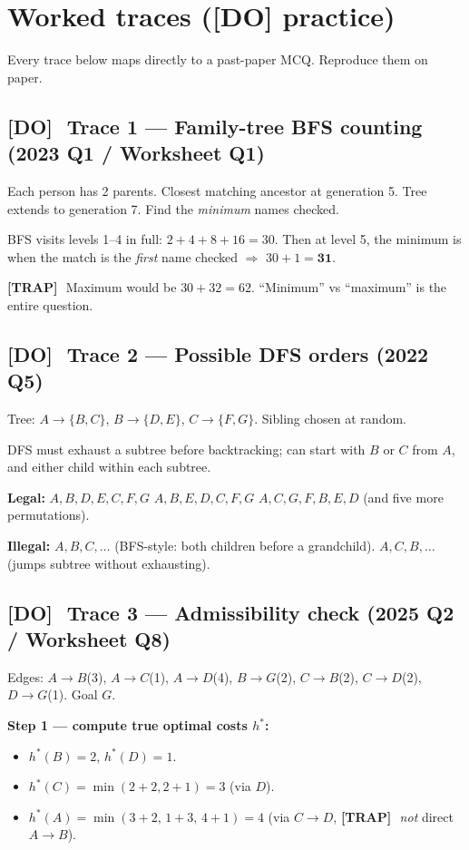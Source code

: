 \documentclass[11pt, a4paper]{article}
\newcommand{\trapflag}{\textcolor{trapBd}{\textbf{[TRAP]}}\,}
\newcommand{\doflag}{\textcolor{doBd}{\textbf{[DO]}}\,}
\begin{document}
\section{Worked traces ([DO] practice)}

Every trace below maps directly to a past-paper MCQ. Reproduce them on paper.

\subsection{\doflag\ Trace 1 --- Family-tree BFS counting (2023 Q1 / Worksheet Q1)}

Each person has 2 parents. Closest matching ancestor at generation 5. Tree extends to generation 7. Find the \emph{minimum} names checked.

BFS visits levels 1--4 in full: $2 + 4 + 8 + 16 = 30$. Then at level 5, the minimum is when the match is the \emph{first} name checked $\Rightarrow$ $30 + 1 = \mathbf{31}$.

\trapflag\ Maximum would be $30 + 32 = 62$. ``Minimum'' vs ``maximum'' is the entire question.

\subsection{\doflag\ Trace 2 --- Possible DFS orders (2022 Q5)}

Tree: $A \to \{B, C\}$, $B \to \{D, E\}$, $C \to \{F, G\}$. Sibling chosen at random.

DFS must exhaust a subtree before backtracking; can start with $B$ or $C$ from $A$, and either child within each subtree.

\textbf{Legal:} $A,B,D,E,C,F,G$ \quad $A,B,E,D,C,F,G$ \quad $A,C,G,F,B,E,D$ \quad (and five more permutations).

\textbf{Illegal:} $A,B,C,\dots$ (BFS-style: both children before a grandchild). $A,C,B,\dots$ (jumps subtree without exhausting).

\subsection{\doflag\ Trace 3 --- Admissibility check (2025 Q2 / Worksheet Q8)}

Edges: $A{\to}B$(3), $A{\to}C$(1), $A{\to}D$(4), $B{\to}G$(2), $C{\to}B$(2), $C{\to}D$(2), $D{\to}G$(1). Goal $G$.

\textbf{Step 1 --- compute true optimal costs $h^*$:}
\begin{itemize}
  \item $h^*(B) = 2$, $h^*(D) = 1$.
  \item $h^*(C) = \min(2{+}2, 2{+}1) = 3$ (via $D$).
  \item $h^*(A) = \min(3{+}2,\, 1{+}3,\, 4{+}1) = 4$ (via $C \to D$, \trapflag\ \emph{not} direct $A \to B$).
\end{itemize}
\end{document}
